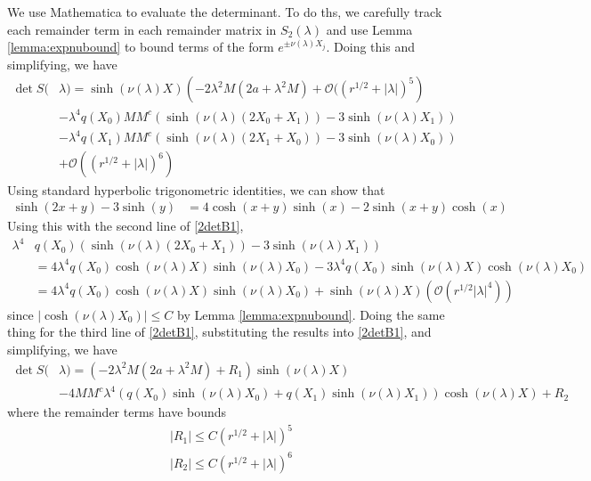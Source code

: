 \documentclass[thesis.tex]{subfiles}
\begin{document}
We use Mathematica to evaluate the determinant. To do ths, we carefully track each remainder term in each remainder matrix in $S_2(\lambda)$ and use Lemma \ref{lemma:expnubound} to bound terms of the form $e^{\pm \nu(\lambda)X_j}$. Doing this and simplifying, we have
\begin{equation}\label{2detB1}
\begin{aligned}
\det S(&\lambda) = \sinh(\nu(\lambda)X)\left(-2 \lambda^2 M (2a + \lambda^2 M) +  \mathcal{O}( (r^{1/2} + |\lambda|)^5 \right) \\
&-\lambda^4 q(X_0) M M^c \left( \sinh(\nu(\lambda)(2 X_0 + X_1)) - 3 \sinh(\nu(\lambda)X_1)  \right) \\
&-\lambda^4 q(X_1) M M^c \left( \sinh(\nu(\lambda)(2 X_1 + X_0)) - 3 \sinh(\nu(\lambda)X_0)  \right) \\
&+ \mathcal{O}( (r^{1/2} + |\lambda|)^6) 
\end{aligned}
\end{equation}
Using standard hyperbolic trigonometric identities, we can show that 
\begin{align*}
\sinh(2 x + y) - 3 \sinh(y) &= 4 \cosh(x + y)\sinh(x) 
-2 \sinh(x+y)\cosh(x) 
\end{align*}
Using this with the second line of \cref{2detB1}, 
\begin{align*}
\lambda^4 &q(X_0) \left( \sinh(\nu(\lambda)(2 X_0 + X_1)) - 3 \sinh(\nu(\lambda)X_1)  \right) \\
&= 4 \lambda^4 q(X_0) \cosh(\nu(\lambda)X)\sinh(\nu(\lambda)X_0) - 3 \lambda^4 q(X_0) \sinh(\nu(\lambda)X)\cosh(\nu(\lambda)X_0) \\
&= 4 \lambda^4 q(X_0) \cosh(\nu(\lambda)X)\sinh(\nu(\lambda)X_0) + \sinh(\nu(\lambda)X)(\mathcal{O}(r^{1/2}|\lambda|^4))
\end{align*}
since $|\cosh(\nu(\lambda)X_0)|\leq C$ by Lemma \ref{lemma:expnubound}. Doing the same thing for the third line of \cref{2detB1}, substituting the results into \cref{2detB1}, and simplifying, we have
\begin{equation}\label{2pdetSlambda}
\begin{aligned}
\det S(&\lambda) = \left(-2 \lambda^2 M (2a + \lambda^2 M) + R_1  \right) \sinh(\nu(\lambda)X) \\
&-4 M M^c \lambda^4 ( q(X_0) \sinh(\nu(\lambda)X_0) + q(X_1) \sinh(\nu(\lambda)X_1) ) \cosh(\nu(\lambda)X)  + R_2
\end{aligned}
\end{equation}
where the remainder terms have bounds
\begin{align*}
|R_1| \leq C(r^{1/2} + |\lambda|)^5 \\
|R_2| \leq C(r^{1/2} + |\lambda|)^6
\end{align*}
\end{document}
